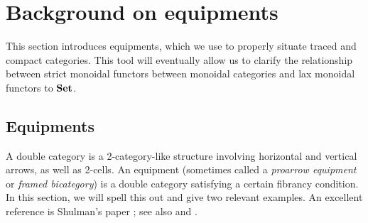 \documentclass[11pt,oneside,article]{memoir}
\begin{document}
\chapter{Background on equipments}
  \label{chap:background_equipments}

This section introduces equipments, which we use to properly situate traced and compact categories.
This tool will eventually allow us to clarify the relationship between strict monoidal functors
between monoidal categories and lax monoidal functors to $\mathbf{Set}$.

\section{Equipments}
  \label{sec:equipments}

A double category is a 2-category-like structure involving horizontal and vertical arrows, as well
as 2-cells. An equipment (sometimes called a \emph{proarrow equipment} or \emph{framed bicategory})
is a double category satisfying a certain fibrancy condition. In this section, we will spell this
out and give two relevant examples. An excellent reference is Shulman's paper \cite{Shulman}; see
also \cite{Wood1} and \cite{Wood2}.
\end{document}
